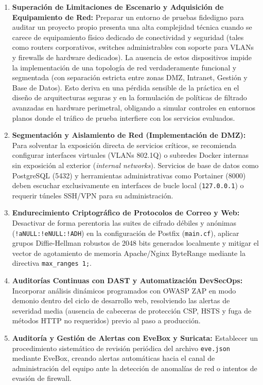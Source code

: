 \begin{enumerate}
  \item \textbf{Superación de Limitaciones de Escenario y Adquisición de Equipamiento de Red:} Preparar un entorno de pruebas fidedigno para auditar un proyecto propio presenta una alta complejidad técnica cuando se carece de equipamiento físico dedicado de conectividad y seguridad (tales como routers corporativos, switches administrables con soporte para VLANs y firewalls de hardware dedicados). La ausencia de estos dispositivos impide la implementación de una topología de red verdaderamente funcional y segmentada (con separación estricta entre zonas DMZ, Intranet, Gestión y Base de Datos). Esto deriva en una pérdida sensible de la práctica en el diseño de arquitecturas seguras y en la formulación de políticas de filtrado avanzadas en hardware perimetral, obligando a simular controles en entornos planos donde el tráfico de prueba interfiere con los servicios evaluados.
  
  \item \textbf{Segmentación y Aislamiento de Red (Implementación de DMZ):} Para solventar la exposición directa de servicios críticos, se recomienda configurar interfaces virtuales (VLANs 802.1Q) o subredes Docker internas sin exposición al exterior (\textit{internal networks}). Servicios de base de datos como PostgreSQL (5432) y herramientas administrativas como Portainer (8000) deben escuchar exclusivamente en interfaces de bucle local (\texttt{127.0.0.1}) o requerir túneles SSH/VPN para su administración.

  \item \textbf{Endurecimiento Criptográfico de Protocolos de Correo y Web:} Desactivar de forma perentoria las suites de cifrado débiles y anónimas (\texttt{!aNULL:!eNULL:!ADH}) en la configuración de Postfix (\texttt{main.cf}), aplicar grupos Diffie-Hellman robustos de 2048 bits generados localmente y mitigar el vector de agotamiento de memoria Apache/Nginx ByteRange mediante la directiva \texttt{max\_ranges 1;}.

  \item \textbf{Auditorías Continuas con DAST y Automatización DevSecOps:} Incorporar análisis dinámicos programados con OWASP ZAP en modo demonio dentro del ciclo de desarrollo web, resolviendo las alertas de severidad media (ausencia de cabeceras de protección CSP, HSTS y fuga de métodos HTTP no requeridos) previo al paso a producción.

  \item \textbf{Auditoría y Gestión de Alertas con EveBox y Suricata:} Establecer un procedimiento sistemático de revisión periódica del archivo \texttt{eve.json} mediante EveBox, creando alertas automáticas hacia el canal de administración del equipo ante la detección de anomalías de red o intentos de evasión de firewall.
\end{enumerate}

